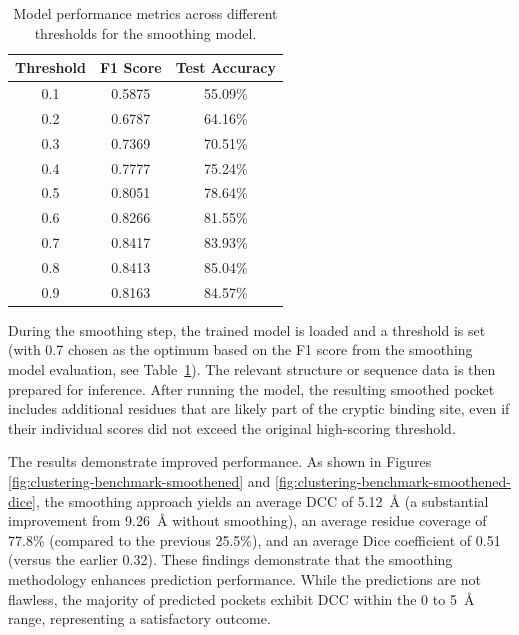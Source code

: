 \begin{table}[htbp]
    \centering
    \caption{Model performance metrics across different thresholds for the smoothing model.}
    \label{tab:smoothing-thresholds}
    \begin{tabular}{c|c|c}
        \hline
        \textbf{Threshold} & \textbf{F1 Score} & \textbf{Test Accuracy} \\
        \hline
        0.1 & 0.5875 & 55.09\% \\
        0.2 & 0.6787 & 64.16\% \\
        0.3 & 0.7369 & 70.51\% \\
        0.4 & 0.7777 & 75.24\% \\
        0.5 & 0.8051 & 78.64\% \\
        0.6 & 0.8266 & 81.55\% \\
        0.7 & 0.8417 & 83.93\% \\
        0.8 & 0.8413 & 85.04\% \\
        0.9 & 0.8163 & 84.57\% \\
        \hline
    \end{tabular}
\end{table}

During the smoothing step, the trained model is loaded and a threshold is set (with 0.7 chosen as the optimum based on the F1 score from the smoothing model evaluation, see Table~\ref{tab:smoothing-thresholds}). The relevant structure or sequence data is then prepared for inference. After running the model, the resulting smoothed pocket includes additional residues that are likely part of the cryptic binding site, even if their individual scores did not exceed the original high-scoring threshold.

The results demonstrate improved performance. As shown in Figures \ref{fig:clustering-benchmark-smoothened} and \ref{fig:clustering-benchmark-smoothened-dice}, the smoothing approach yields an average DCC of 5.12~\AA{} (a substantial improvement from 9.26~\AA{} without smoothing), an average residue coverage of 77.8\% (compared to the previous 25.5\%), and an average Dice coefficient of 0.51 (versus the earlier 0.32). These findings demonstrate that the smoothing methodology enhances prediction performance. While the predictions are not flawless, the majority of predicted pockets exhibit DCC within the 0 to 5~\AA{} range, representing a satisfactory outcome.

